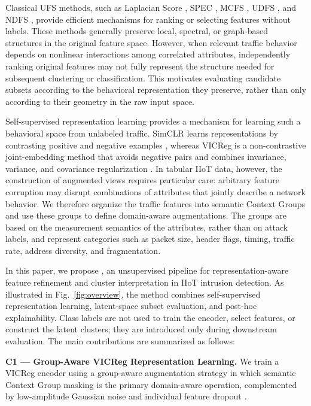 Classical UFS methods, such as Laplacian Score \cite{he2005laplacian}, SPEC \cite{zhao2007spectral}, MCFS \cite{cai2010unsupervised}, UDFS \cite{yang2011l2}, and NDFS \cite{li2012unsupervised}, provide efficient mechanisms for ranking or selecting features without labels. These methods generally preserve local, spectral, or graph-based structures in the original feature space. However, when relevant traffic behavior depends on nonlinear interactions among correlated attributes, independently ranking original features may not fully represent the structure needed for subsequent clustering or classification. This motivates evaluating candidate subsets according to the behavioral representation they preserve, rather than only according to their geometry in the raw input space.

Self-supervised representation learning provides a mechanism for learning such a behavioral space from unlabeled traffic. SimCLR learns representations by contrasting positive and negative examples \cite{chen2020simple}, whereas VICReg is a non-contrastive joint-embedding method that avoids negative pairs and combines invariance, variance, and covariance regularization \cite{bardes2022vicreg}. In tabular IIoT data, however, the construction of augmented views requires particular care: arbitrary feature corruption may disrupt combinations of attributes that jointly describe a network behavior. We therefore organize the traffic features into semantic Context Groups and use these groups to define domain-aware augmentations. The groups are based on the measurement semantics of the attributes, rather than on attack labels, and represent categories such as packet size, header flags, timing, traffic rate, address diversity, and fragmentation.

In this paper, we propose \method{}, an unsupervised pipeline for representation-aware feature refinement and cluster interpretation in IIoT intrusion detection. As illustrated in Fig.~\ref{fig:overview}, the method combines self-supervised representation learning, latent-space subset evaluation, and post-hoc explainability. Class labels are not used to train the encoder, select features, or construct the latent clusters; they are introduced only during downstream evaluation. The main contributions are summarized as follows:

\textbf{C1 --- Group-Aware VICReg Representation Learning.} We train a VICReg encoder using a group-aware augmentation strategy in which semantic Context Group masking is the primary domain-aware operation, complemented by low-amplitude Gaussian noise and individual feature dropout \cite{bardes2022vicreg}.

